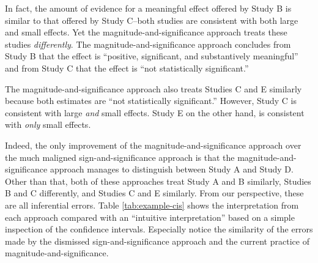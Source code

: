 \documentclass[12pt]{article}
\begin{document}
In fact, the amount of evidence for a meaningful effect offered by Study B is similar to that offered by Study C--both studies are consistent with both large and small effects. Yet the magnitude-and-significance approach treats these studies \emph{differently}. The magnitude-and-significance approach concludes from Study B that the effect is ``positive, significant, and substantively meaningful''  and from Study C that the effect is ``not statistically significant.''

The magnitude-and-significance approach also treats Studies C and E similarly because both estimates are ``not statistically significant.'' However, Study C is consistent with large \emph{and} small effects. Study E on the other hand, is consistent with \emph{only} small effects.

Indeed, the only improvement of the magnitude-and-significance approach over the much maligned sign-and-significance approach is that the magnitude-and-significance approach manages to distinguish between Study A and Study D. Other than that, both of these approaches treat Study A and B similarly, Studies B and C differently, and Studies C and E similarly. From our perspective, these are all inferential errors. Table \ref{tab:example-cis} shows the interpretation from each approach compared with an ``intuitive interpretation'' based on a simple inspection of the confidence intervals. Especially notice the similarity of the errors made by the dismissed sign-and-significance approach and the current practice of magnitude-and-significance.
\end{document}
